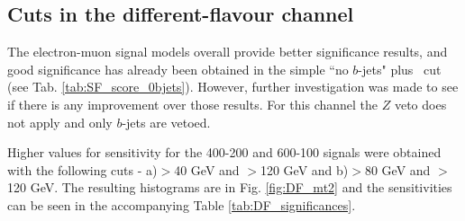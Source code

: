 \subsection{Cuts in the different-flavour channel}

The electron-muon signal models overall provide better significance results, and good significance has already been obtained in the simple ``no $b$-jets" plus \mttwo \, cut (see Tab. \ref{tab:SF_score_0bjets}). However, further investigation was made to see if there is any improvement over those results.
For this channel the $Z$ veto does not apply and only $b$-jets are vetoed.

Higher values for sensitivity for the 400-200 and 600-100 signals were obtained with the following cuts - a)\metrel$>$40 GeV and \mttwo$>$120 GeV and b)\metrel$>$80 GeV and \mttwo$>$120 GeV. The resulting histograms are in Fig. \ref{fig:DF_mt2} and the sensitivities can be seen in the accompanying Table \ref{tab:DF_significances}.

